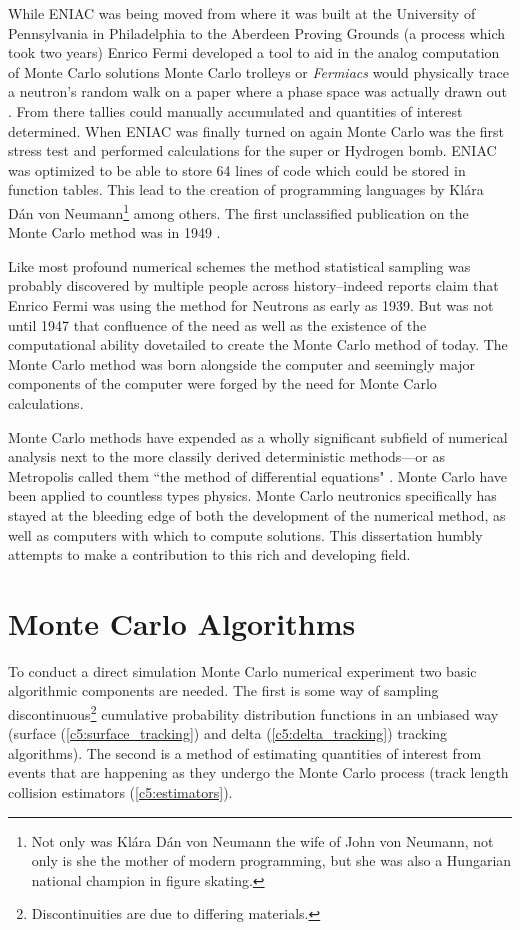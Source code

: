 While ENIAC was being moved from where it was built at the University of Pennsylvania in Philadelphia to the Aberdeen Proving Grounds (a process which took two years) Enrico Fermi developed a tool to aid in the analog computation of Monte Carlo solutions
Monte Carlo trolleys or \textit{Fermiacs} would physically trace a neutron's random walk on a paper where a phase space was actually drawn out \cite{metropolis_1987_history}.
From there tallies could manually accumulated and quantities of interest determined.
When ENIAC was finally turned on again Monte Carlo was the first stress test and performed calculations for the super or Hydrogen bomb.
ENIAC was optimized to be able to store 64 lines of code which could be stored in function tables. This lead to the creation of programming languages by Klára Dán von Neumann\footnote{Not only was Klára Dán von Neumann the wife of John von Neumann, not only is she the mother of modern programming, but she was also a Hungarian national champion in figure skating.} among others.
The first unclassified publication on the Monte Carlo method was in 1949 \cite{metropolis_1949_monteCarlo}.

Like most profound numerical schemes the method statistical sampling was probably discovered by multiple people across history--indeed reports claim that Enrico Fermi was using the method for Neutrons as early as 1939.
But was not until 1947 that confluence of the need as well as the existence of the computational ability dovetailed to create the Monte Carlo method of today.
The Monte Carlo method was born alongside the computer and seemingly major components of the computer were forged by the need for Monte Carlo calculations.

Monte Carlo methods have expended as a wholly significant subfield of numerical analysis next to the more classily derived deterministic methods---or as Metropolis called them ``the method of differential equations" \cite{anderson_1986_maniac}.
Monte Carlo have been applied to countless types physics.
Monte Carlo neutronics specifically has stayed at the bleeding edge of both the development of the numerical method, as well as computers with which to compute solutions.
This dissertation humbly attempts to make a contribution to this rich and developing field.


\section{Monte Carlo Algorithms}

To conduct a direct simulation Monte Carlo numerical experiment two basic algorithmic components are needed.
The first is some way of sampling discontinuous\footnote{Discontinuities are due to differing materials.} cumulative probability distribution functions in an unbiased way (surface (\ref{c5:surface_tracking}) and delta (\ref{c5:delta_tracking}) tracking algorithms).
The second is a method of estimating quantities of interest from events that are happening as they undergo the Monte Carlo process (track length collision estimators (\ref{c5:estimators}).

